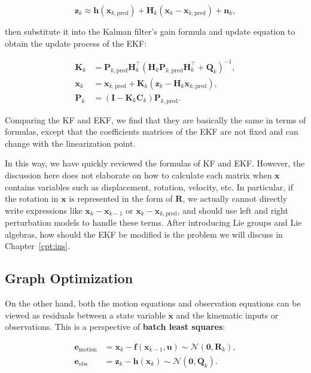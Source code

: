\begin{equation}
	\mathbf{z}_k \approx \mathbf{h}(\mathbf{x}_{k, \text{pred}}) + \mathbf{H}_k (\mathbf{x}_k - \mathbf{x}_{k, \text{pred}}) + \mathbf{n}_k,
\end{equation}

then substitute it into the Kalman filter's gain formula and update equation to obtain the update process of the EKF:

\begin{mdframed}
\begin{align}
	\mathbf{K}_k &= \mathbf{P}_{k, \text{pred}} \mathbf{H}_k^\top (\mathbf{H}_k \mathbf{P}_{k, \text{pred}} \mathbf{H}_k^\top + \mathbf{Q}_k)^{-1}, \\
	\mathbf{x}_k &= \mathbf{x}_{k, \text{pred}} + \mathbf{K}_k (\mathbf{z}_k - \mathbf{H}_k \mathbf{x}_{k, \text{pred}}), \\
	\mathbf{P}_k &= (\mathbf{I} - \mathbf{K}_k \mathbf{C}_k) \mathbf{P}_{k, \text{pred}}.
\end{align}
\end{mdframed}

Comparing the KF and EKF, we find that they are basically the same in terms of formulas, except that the coefficients matrices of the EKF are not fixed and can change with the linearization point.

In this way, we have quickly reviewed the formulas of KF and EKF. However, the discussion here does not elaborate on how to calculate each matrix when $\mathbf{x}$ contains variables such as displacement, rotation, velocity, etc. In particular, if the rotation in $\mathbf{x}$ is represented in the form of $\mathbf{R}$, we actually cannot directly write expressions like $\mathbf{x}_k - \mathbf{x}_{k-1}$ or $\mathbf{x}_k - \mathbf{x}_{k, \text{pred}}$, and should use left and right perturbation models to handle these terms. After introducing Lie groups and Lie algebras, how should the EKF be modified is the problem we will discuss in Chapter~\ref{cpt:ins}.

\subsection{Graph Optimization}

On the other hand, both the motion equations and observation equations can be viewed as residuals between a state variable $\mathbf{x}$ and the kinematic inputs or observations. This is a perspective of \textbf{batch least squares}:

\begin{align}\label{eq:2.118}
	\mathbf{e}_{\text{motion}} &= \mathbf{x}_k - \mathbf{f}(\mathbf{x}_{k-1}, \mathbf{u}) \sim \mathcal{N}(\mathbf{0}, \mathbf{R}_k), \\
	\mathbf{e}_{\text{obs}} &= \mathbf{z}_k - \mathbf{h}(\mathbf{x}_k) \sim \mathcal{N}(\mathbf{0}, \mathbf{Q}_k).
\end{align}

